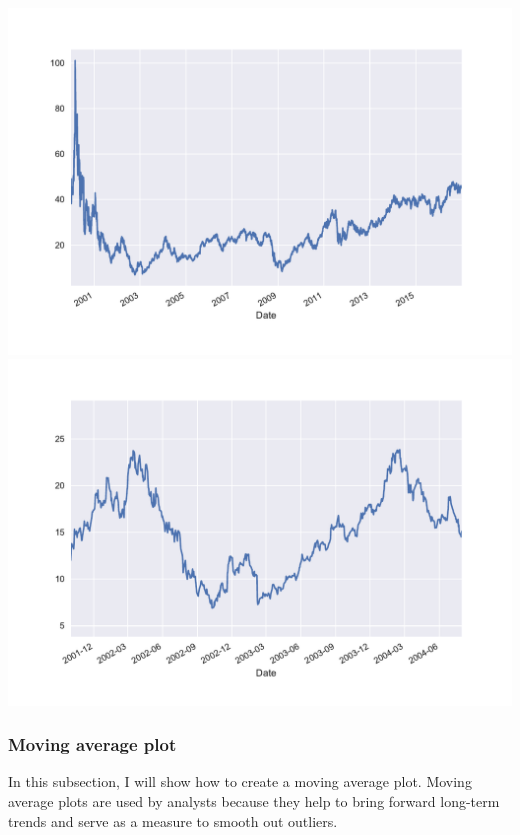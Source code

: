 \documentclass[12pt, a4paper]{article}
\begin{document}
\begin{multicols}{2}
{\centering
\includegraphics[width=\columnwidth]{src/stocks/simple/oneplot}\\
\label{fig:stock_oneplot}}
{\centering
\includegraphics[width=\columnwidth]{src/stocks/simple/oneplot_zoom}\\
\label{fig:stock_oneplot_zoom}}
\end{multicols}

\subsubsection{Moving average plot}

In this subsection, I will show how to create a moving average plot. Moving average plots are used by analysts because they help to bring forward long-term trends and serve as a measure to smooth out outliers.
\end{document}
